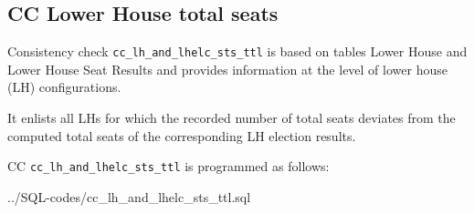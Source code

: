 \subsection{CC Lower House total seats}\label{cc_lh_and_lhelc_sts_ttl}
Consistency check \texttt{\footnotesize cc\_lh\_and\_lhelc\_sts\_ttl} is based on tables Lower House and Lower House Seat Results and provides information at the level of lower house (LH) configurations.

It enlists all LHs for which the recorded number of total seats deviates from the computed total seats of the corresponding LH election results.

CC \texttt{\footnotesize cc\_lh\_and\_lhelc\_sts\_ttl} is programmed as follows:

%
{../SQL-codes/cc_lh_and_lhelc_sts_ttl.sql}
